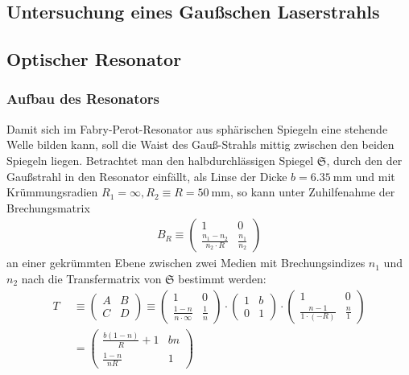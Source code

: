 \documentclass[11pt,a4paper,oneside]{scrartcl}
\begin{document}
\subsection{Untersuchung eines Gaußschen Laserstrahls}
\subsection{Optischer Resonator}
\subsubsection{Aufbau des Resonators}
Damit sich im Fabry-Perot-Resonator aus sphärischen Spiegeln eine stehende Welle bilden kann, soll die Waist des Gauß-Strahls mittig zwischen den beiden Spiegeln liegen. Betrachtet man den halbdurchlässigen Spiegel $\mathfrak{S}$, durch den der Gaußstrahl in den Resonator einfällt, als Linse der Dicke $b=6.35\ \mathrm{mm}$ und mit Krümmungsradien $R_1=\infty,R_2\equiv R=50\ \mathrm{mm}$, so kann unter Zuhilfenahme der Brechungsmatrix 
\begin{align}
B_R\equiv \begin{pmatrix}
1 & 0\\
\frac{n_1-n_2}{n_2\cdot R} & \frac{n_1}{n_2}
\end{pmatrix} 
\end{align}
an einer gekrümmten Ebene zwischen zwei Medien mit Brechungsindizes $n_1$ und $n_2$
nach \cite{dewiki:225621757} die Transfermatrix von $\mathfrak{S}$ bestimmt werden:
\begin{align}
T & \equiv
\begin{pmatrix}
A & B\\
C & D 
\end{pmatrix} 
\equiv
\begin{pmatrix}
1 & 0\\
\frac{1-n}{n\cdot \infty} & \frac{1}{n}
\end{pmatrix} 
\cdot
\begin{pmatrix}
1 & b\\
0 & 1
\end{pmatrix} 
\cdot
\begin{pmatrix}
1 & 0\\
\frac{n-1}{1\cdot(- R)} & \frac{n}{1}
\end{pmatrix} 
\\ \quad& = \begin{pmatrix}
\frac{b(1-n)}{R}+1 & bn\\
\frac{1-n}{nR} & 1
\end{pmatrix}
\end{align}
\end{document}

